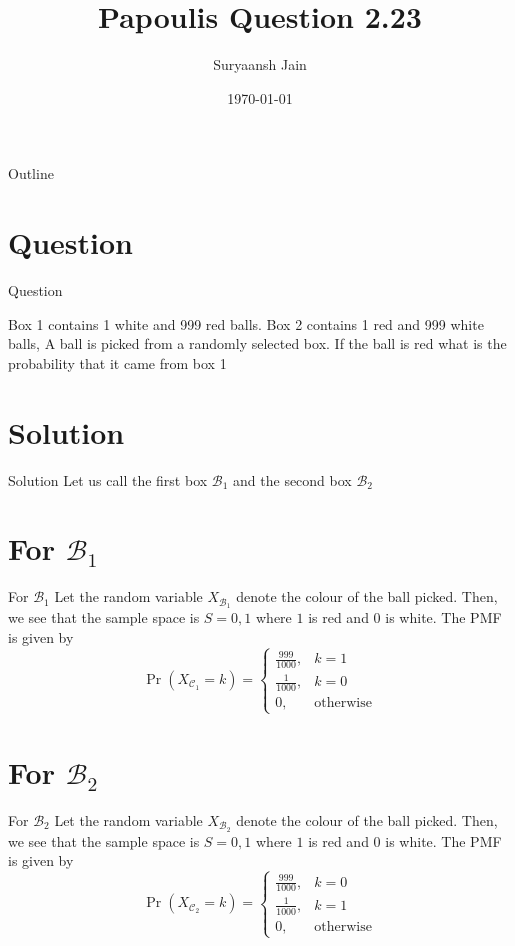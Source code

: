 \documentclass{beamer}
\title{Papoulis Question 2.23}
\author{Suryaansh Jain}
\date{\today}
\providecommand{\pr}[1]{\ensuremath{\Pr\left(#1\right)}}
\begin{document}
\begin{frame}
    \titlepage 
\end{frame}

\logo{}


\begin{frame}{Outline}
    \tableofcontents
\end{frame}


\section{Question}
\begin{frame}{Question}

Box 1 contains 1 white and 999 red balls. Box 2 contains 1 red and 999 white balls, A ball
is picked from a randomly selected box. If the ball is red what is the probability that it came from box 1
\end{frame}


\section{Solution}
\begin{frame}{Solution}
Let us call the first box $\mathcal{B}_1$ and the second box $\mathcal{B}_2$
\end{frame} 

\section{For $\mathcal{B}_1$}
\begin{frame}{For $\mathcal{B}_1$}
Let the random variable $X_{\mathcal{B}_1}$ denote the colour of the ball picked. Then, we see that the sample space is $S = {0, 1}$ where $1$ is red and $0$ is white. The PMF is given by
\begin{equation}
\pr{X_{\mathcal{C}_1} = k} = 
\begin{cases}
\frac{999}{1000}, & k = 1 \\
\frac{1}{1000}, & k = 0 \\
0, & \text{otherwise} 
\end{cases}
\label{pmf}
\end{equation}
\end{frame} 

\section{For $\mathcal{B}_2$}
\begin{frame}{For $\mathcal{B}_2$}
Let the random variable $X_{\mathcal{B}_2}$ denote the colour of the ball picked. Then, we see that the sample space is $S = {0, 1}$ where $1$ is red and $0$ is white. The PMF is given by
\begin{equation}
\pr{X_{\mathcal{C}_2} = k} = 
\begin{cases}
\frac{999}{1000}, & k = 0 \\
\frac{1}{1000}, & k = 1 \\
0, & \text{otherwise} 
\end{cases}
\label{pmf}
\end{equation}
\end{frame} 
\end{document}
